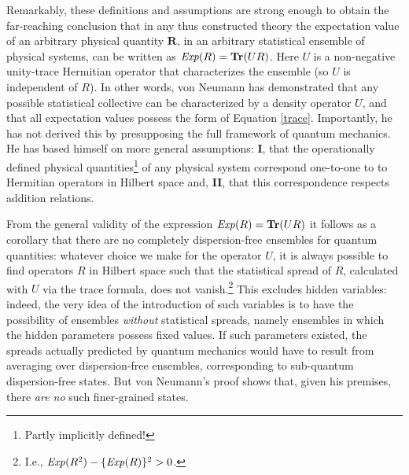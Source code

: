 \documentclass[12pt]{article}
\begin{document}
Remarkably, these definitions and assumptions are strong enough to obtain \cite[pp.\@ 167--168]{VN1} the far-reaching conclusion that in any thus constructed theory the expectation value of an arbitrary physical quantity $\textbf{R}$, in an arbitrary statistical ensemble of physical systems, can be written as ${\it Exp}(R) = \textbf{Tr}(UR)$. Here $U$ is a non-negative unity-trace Hermitian operator that characterizes the ensemble (so $U$ is independent of $R$). In other words, von Neumann has demonstrated that any possible statistical collective can be characterized by a density operator $U$, and that all expectation values possess the form of Equation \ref{trace}. Importantly, he has not derived this by presupposing the full framework of quantum mechanics. He has based himself on more general assumptions: \textbf{I}, that the operationally defined physical quantities\footnote{Partly implicitly defined!} of any physical system correspond one-to-one to to Hermitian operators in Hilbert space and, \textbf{II}, that this correspondence respects addition relations.

From the general validity of the expression ${\it Exp}(R) = \textbf{Tr}(UR)$ it follows as a corollary that there are no completely dispersion-free ensembles for quantum quantities: whatever choice we make for the operator $U$, it is always possible to find operators $R$ in Hilbert space such that the statistical spread of $R$, calculated with $U$ via the trace formula, does not vanish.\footnote{I.e., ${\it Exp}(R^2) - \{{\it Exp}(R)\}^2 > 0$.} This excludes hidden variables: indeed, the very idea of the introduction of such variables is to have the possibility of ensembles \emph{without} statistical spreads, namely ensembles in which the hidden parameters possess fixed values. If such parameters existed, the spreads actually predicted by quantum mechanics would have to result from averaging over dispersion-free ensembles, corresponding to sub-quantum dispersion-free states. But von Neumann's proof shows that, given his premises, there \emph{are no} such finer-grained states.
\end{document}
